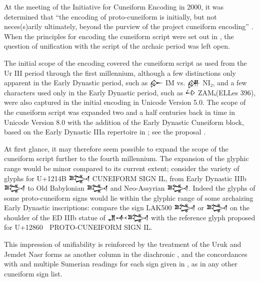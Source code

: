 ﻿At the meeting of the Initiative for Cuneiform Encoding in 2000, it
was determined that “the encoding of proto-cuneiform is initially, but
not neces(s)arily ultimately, beyond the purview of the project
cuneiform encoding” \cite{L2/00-398}. When the principles for encoding
the cuneiform script were set out in \cite{L2/03-162}, the question of
unification with the script of the archaic period was left open.

The initial scope of the encoding covered the cuneiform script as used
from the Ur III period through the first millennium, although a few
distinctions only apparent in the Early Dynastic period, such as {\oraccnoto 𒅎} IM
vs. {\oraccnoto 𒉎} NI₂, and a few characters used only in the Early Dynastic
period, such as {\oraccnoto 𒍡} ZAMₓ(ELLes 396), were also captured in the initial
encoding in Unicode Version 5.0. The scope of the cuneiform script was
expanded two and a half centuries back in time in Unicode Version 8.0
with the addition of the Early Dynastic Cuneiform block, based on the
Early Dynastic IIIa repertoire in \cite{LAK}; see the
proposal \cite{L2/12-208}.

At first glance, it may therefore seem possible to expand the scope of
the cuneiform script further to the fourth millennium. The expansion
of the glyphic range would be minor compared to its current extent;
consider the variety of glyphs for U+1214B {\oraccnoto 𒅋} CUNEIFORM
SIGN IL, from Early Dynastic IIIb {\oraccrsp 𒅋} to Old Babylonian
{\oraccobf 𒅋} and Neo-Assyrian {\oraccnao 𒅋}. Indeed the glyphs of
some proto-cuneiform signs would lie within the glyphic range of some
archaizing Early Dynastic inscriptions: compare the sign LAK500
{\oracclak 𒅋} or {\oracclaksaltiii 𒅋} on the shoulder of the ED IIIb
statue of {\oraccnoto 𒂗𒋾𒅋} \cite{P225850} with the reference glyph
proposed for U+12860 {\oraccpc 𒡠} PROTO-CUNEIFORM SIGN IL.

%

This impression of unifiability is reinforced by the treatment of the
Uruk and Jemdet Nasr forms as another column in the
diachronic \cite{LabatMEA}, and the concordances with \cite{LAK} and
multiple Sumerian readings for each sign given
in \cite[167--346]{ATU2}, as in any other cuneiform sign list.

